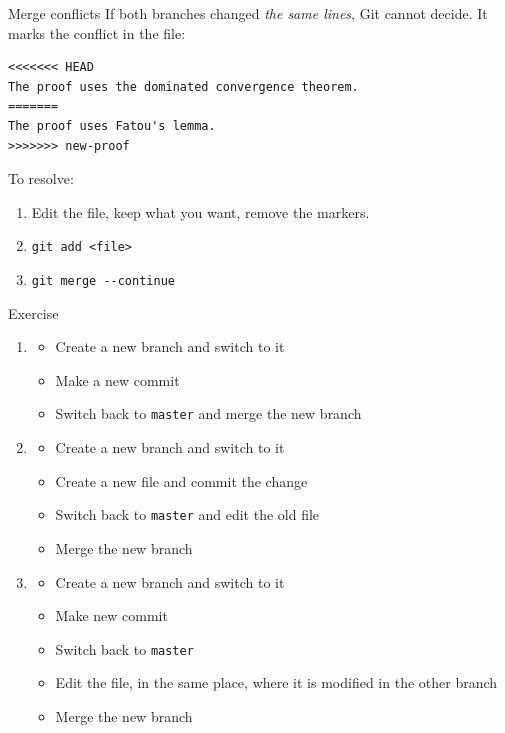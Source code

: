 \documentclass[11pt]{beamer}
\newcommand{\exercise}[1]{
  \begin{frame}{Exercise}
    #1
  \end{frame}
}
\begin{document}
\begin{frame}[fragile]{Merge conflicts}
  If both branches changed \emph{the same lines}, Git cannot decide.
  It marks the conflict in the file:
\begin{lstlisting}
<<<<<<< HEAD
The proof uses the dominated convergence theorem.
=======
The proof uses Fatou's lemma.
>>>>>>> new-proof
\end{lstlisting}
  \vfill
  To resolve:
  \begin{enumerate}
    \item Edit the file, keep what you want, remove the markers.
    \item \texttt{git add <file>}
    \item \texttt{git merge -{}-continue}
  \end{enumerate}
\end{frame}

\exercise{
  \begin{enumerate}
  \item
    \begin{itemize}
    \item Create a new branch and switch to it
    \item Make a new commit
    \item Switch back to \texttt{master} and merge the new branch
    \end{itemize}
  \item
    \begin{itemize}
    \item Create a new branch and switch to it
    \item Create a new file and commit the change
    \item Switch back to \texttt{master} and edit the old file
    \item Merge the new branch
    \end{itemize}
  \item
    \begin{itemize}
    \item Create a new branch and switch to it
    \item Make new commit
    \item Switch back to \texttt{master}
    \item Edit the file, in the same place, where it is modified in
      the other branch
    \item Merge the new branch
    \end{itemize}
  \end{enumerate}
}
\end{document}
